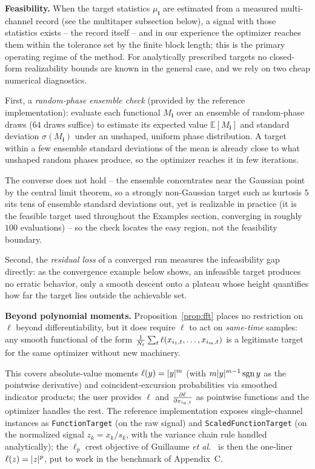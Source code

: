 \documentclass[10pt,a4paper]{article}
\numberwithin{equation}{section}
\DeclarePairedDelimiter\abs{\lvert}{\rvert}
\DeclarePairedDelimiter\mat{(}{)}
\begin{document}
\textbf{Feasibility.} When the target statistics $\mu_\mathbf{i}$ are estimated from a measured multi-channel record (see the multitaper subsection below), a signal with those statistics exists -- the record itself -- and in our experience the optimizer reaches them within the tolerance set by the finite block length; this is the primary operating regime of the method. 
For analytically prescribed targets no closed-form realizability bounds are known in the general case, and we rely on two cheap numerical diagnostics. 

First, a \emph{random-phase ensemble check} (provided by the reference implementation):
evaluate each functional $M_\mathbf{i}$ over an ensemble of random-phase draws ($64$ draws suffice) to estimate its expected value $\mathbb{E}[M_\mathbf{i}]$ and standard deviation $\sigma(M_\mathbf{i})$ under an unshaped, uniform phase distribution. A target within a few ensemble standard deviations of the mean is already close to what unshaped random phases produce, so the optimizer reaches it in few iterations. 

The converse does not hold -- the ensemble concentrates near the Gaussian point by the central limit theorem, so a strongly non-Gaussian target such as kurtosis $5$ sits tens of ensemble standard deviations out, yet is realizable in practice (it is the feasible target used throughout the Examples section, converging in roughly $100$ evaluations) -- so the check locates the easy region, not the feasibility boundary. 

Second, the \emph{residual loss} of a converged run measures the infeasibility gap directly: as the convergence example below shows, an infeasible target produces no erratic behavior, only a smooth descent onto a plateau whose height quantifies how far the target lies outside the achievable set.

\textbf{Beyond polynomial moments.} Proposition~\ref{prop:fft} places no restriction on $\ell$ beyond differentiability, but it does require $\ell$ to act on \emph{same-time} samples: any smooth functional of the form $\frac{1}{N_t}\sum_t \ell \mat{x_{i_1,t},\ldots,x_{i_m,t}}$ is a legitimate target for the same optimizer without new machinery. 

This covers absolute-value moments $\ell\mat{y}=\abs{y}^m$ (with $m\abs{y}^{m-1}\operatorname{sgn} y$ as the pointwise derivative) and coincident-excursion probabilities via smoothed indicator products; the user provides $\ell$ and $\frac{\partial \ell}{\partial x_{i_a,t}}$ as pointwise functions and the optimizer handles the rest. 
The reference implementation exposes single-channel instances as \texttt{FunctionTarget} (on the raw signal) and \texttt{ScaledFunctionTarget} (on the normalized signal $z_k = x_k/s_k$, with the variance chain rule handled analytically); the $\ell_p$ crest objective of Guillaume \emph{et al.}~\cite{guillaume1991crest} is then the one-liner $\ell\mat{z}=\abs{z}^p$, put to work in the benchmark of Appendix~C. 
\end{document}
